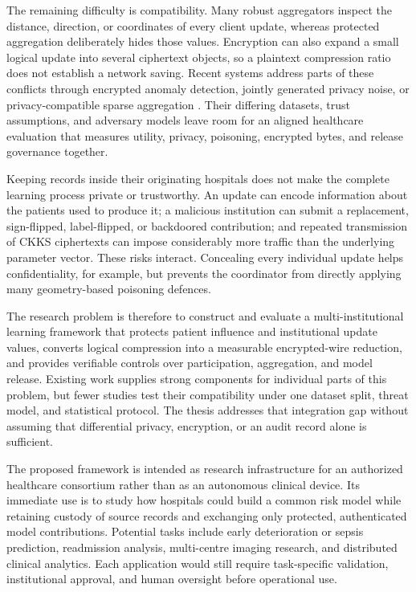 The remaining difficulty is compatibility. Many robust aggregators inspect the
distance, direction, or coordinates of every client update, whereas protected
aggregation deliberately hides those values. Encryption can also expand a small
logical update into several ciphertext objects, so a plaintext compression ratio
does not establish a network saving. Recent systems address parts of these
conflicts through encrypted anomaly detection, jointly generated privacy noise,
or privacy-compatible sparse aggregation \cite{xu2024ddfed,gu2025dpbrem,
asi2025preamble}. Their differing datasets, trust assumptions, and adversary
models leave room for an aligned healthcare evaluation that measures utility,
privacy, poisoning, encrypted bytes, and release governance together.


Keeping records inside their originating hospitals does not make the complete
learning process private or trustworthy. An update can encode information about
the patients used to produce it; a malicious institution can submit a replacement,
sign-flipped, label-flipped, or backdoored contribution; and repeated transmission
of CKKS ciphertexts can impose considerably more traffic than the underlying
parameter vector. These risks interact. Concealing every individual update helps
confidentiality, for example, but prevents the coordinator from directly applying
many geometry-based poisoning defences.

The research problem is therefore to construct and evaluate a multi-institutional
learning framework that protects patient influence and institutional update
values, converts logical compression into a measurable encrypted-wire reduction,
and provides verifiable controls over participation, aggregation, and model
release. Existing work supplies strong components for individual parts of this
problem, but fewer studies test their compatibility under one dataset split,
threat model, and statistical protocol. The thesis addresses that integration gap
without assuming that differential privacy, encryption, or an audit record alone
is sufficient.


The proposed framework is intended as research infrastructure for an authorized
healthcare consortium rather than as an autonomous clinical device. Its immediate
use is to study how hospitals could build a common risk model while retaining
custody of source records and exchanging only protected, authenticated model
contributions. Potential tasks include early deterioration or sepsis prediction,
readmission analysis, multi-centre imaging research, and distributed clinical
analytics. Each application would still require task-specific validation,
institutional approval, and human oversight before operational use.

